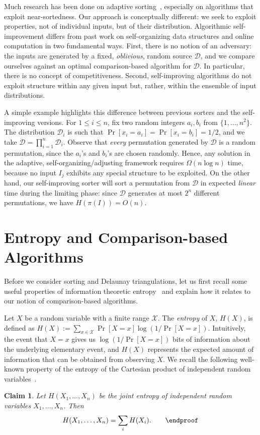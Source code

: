 \documentclass{siamltex}
\newcommand{\D}{\mathcal{D}}
\newcommand{\cX}{\mathcal{X}}
\newcommand{\eqdef}{:=}
\newtheorem{claim}[theorem]{Claim}
\begin{document}
Much research has been done on adaptive sorting~\cite{EstivillW},
especially on algorithms that exploit near-sortedness. 
Our approach is conceptually different: we seek to exploit
properties, not of individual inputs, but of their distribution.
Algorithmic self-improvement differs from past work on
self-organizing data structures and online computation in two 
fundamental ways.
First, there is no notion of an adversary: the inputs are generated by
a fixed, \emph{oblivious}, random source $\D$, and we compare ourselves
against an optimal comparison-based algorithm for $\D$. In 
particular, there is  no concept of competitiveness.
Second, self-improving algorithms do not exploit structure within 
any given input
but, rather, within the ensemble of input distributions. 

A simple example highlights this difference between previous sorters
and the self-improving versions. For $1 \leq i \leq n$, fix two random 
integers $a_i,b_i$
from $\{1,\ldots, n^2\}$. The distribution $\D_i$ is such
that $\Pr[x_i = a_i] = \Pr[x_i = b_i] = 1/2$, and
we take $\D = \prod_{i=1}^n \D_i$.
Observe that \emph{every} permutation generated by $\D$
is a random permutation, since the $a_i$'s and $b_i$'s are
chosen randomly.
Hence, any solution in the adaptive, self-organizing/adjusting framework
requires $\Omega(n\log n)$ time, because no input
$I_j$ exhibits any special structure to be exploited. 
On the other hand, our self-improving sorter
will sort a permutation from $\D$ in expected \emph{linear} time
during the limiting phase: since $\D$ generates
at most $2^n$ different permutations, we have $H(\pi(I)) = O(n)$.

\section{Entropy and Comparison-based Algorithms}\label{sec:entropy}

Before we consider sorting and Delaunay triangulations, let us first recall 
some 
useful properties of information theoretic entropy~\cite{CoverTh06} and 
explain how it relates to our notion of comparison-based algorithms.

Let $X$ be a random variable with a finite range $\cX$. The 
\emph{entropy} of $X$, $H(X)$, is defined as 
$H(X) \eqdef \sum_{x \in \cX} \Pr[X = x] \log(1/\Pr[X = x])$.
Intuitively, the event that $X = x$ gives us 
$\log(1/\Pr[X = x])$ bits of information about the underlying
elementary event, and $H(X)$ represents
the expected amount of information that can be obtained from observing
$X$. We recall the following well-known property of
the entropy of the Cartesian product
of independent random variables~\cite[Theorem~2.5.1]{CoverTh06}.
\medskip
\begin{claim}\label{clm:joint} 
Let $H(X_1,  \ldots, X_n)$
be the joint entropy of independent random variables $X_1, \ldots, X_n$.
Then  
\[ 
H(X_1,  \ldots, X_n) = \sum_i H(X_i).\qquad\endproof
\]
\end{claim}
\end{document}

